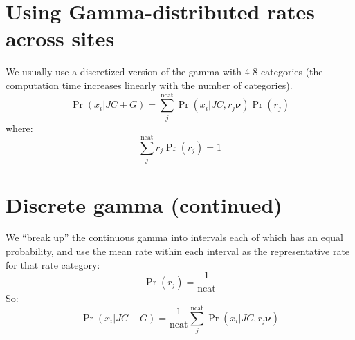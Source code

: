 \documentclass[landscape]{foils}
\begin{document}
\section*{Using Gamma-distributed rates across sites}
\begin{compactitem}
	\item We usually use a discretized version of the gamma with 4-8 categories (the computation time increases linearly with the number of categories).
	\[\Pr(x_i|JC+G) = \sum_j^{\mbox{ncat}} \Pr(x_i|JC, r_j{\bm \nu})\Pr(r_j)\]
	where:
		\[\sum_j^{\mbox{ncat}} r_j\Pr(r_j) = 1\]

\myNewSlide
\section*{Discrete gamma (continued)}
We ``break up'' the continuous gamma into intervals each of which has an equal probability, and use the mean rate within each interval as the representative rate for that rate category:
\[\Pr(r_j) = \frac{1}{\mbox{ncat}}\]
So:
	\[\Pr(x_i|JC+G) = \frac{1}{\mbox{ncat}} \sum_j^{\mbox{ncat}} \Pr(x_i|JC, r_j{\bm \nu})\]

\end{compactitem}

\myNewSlide
 

\myNewSlide
 

\myNewSlide
 

\myNewSlide
 

\myNewSlide
 


\myNewSlide



\end{document}

